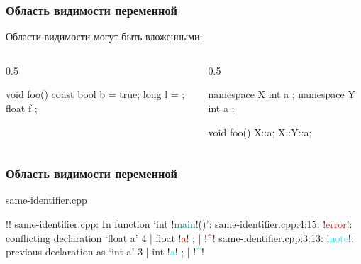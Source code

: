 \documentclass[compress, 8pt, aspectratio=169]{beamer}
\begin{document}
\begin{frame}[fragile]

    \frametitle{Область видимости переменной}

    Области видимости могут быть вложенными:

    \begin{columns}[T]

        \begin{column}{0.5\textwidth}

            \begin{myinplacelisting}[minted language=cpp]
void foo() {
    const bool b = true;
    {
        {
            long l = {};
        }
        float f {};
    }
}
            \end{myinplacelisting}

        \end{column}

        \begin{column}{0.5\textwidth}

            \begin{myinplacelisting}[minted language=cpp]
namespace X {
    int a {};
    namespace Y {
            int a {};
    }
}

void foo() {
    X::a;
    X::Y::a;
}
            \end{myinplacelisting}

        \end{column}

    \end{columns}

\end{frame}

\begin{frame}[fragile]

    \frametitle{Область видимости переменной}

        {same-identifier.cpp}

    \begin{terminalwindow}
!!
same-identifier.cpp: In function ‘int !\textcolor{teal}{main}!()’:
same-identifier.cpp:4:15: !\textcolor{red}{error}!: conflicting declaration ‘float a’
    4 |         float !\textcolor{red}{a}! {};
      |               !\textcolor{red}{\^{}}!
same-identifier.cpp:3:13: !\textcolor{cyan}{note}!: previous declaration as ‘int a’
    3 |         int !\textcolor{cyan}{a}! {};
      |             !\textcolor{cyan}{\^{}}!
    \end{terminalwindow}

\end{frame}
\end{document}
